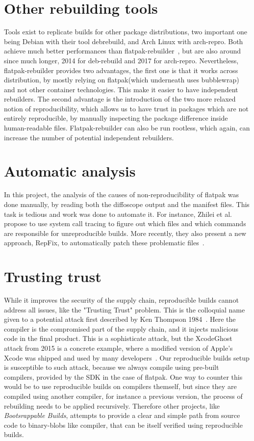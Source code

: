 \documentclass[a4paper,11pt,oneside]{report}
\theoremstyle{definition}
\newcommand{\sysname}{flatpak-rebuilder\xspace}
\newcommand{\Sysname}{Flatpak-rebuilder\xspace}
\newcommand{\rb}{reproducible builds\xspace}
\newcommand{\fp}{flatpak\xspace}
\begin{document}
\section{Other rebuilding tools}
Tools exist to replicate builds for other package distributions, two important
one being Debian with their tool debrebuild, and Arch Linux with arch-repro.
Both achieve much better performances than \sysname~\cite{debian:repro,
arch-rebuilderd}, but are also around since much longer, 2014 for deb-rebuild
and 2017 for arch-repro. Nevertheless, \sysname provides two advantages, the
first one is that it works across distribution, by mostly relying on \fp (which
underneath uses bubblewrap) and not other container technologies. This make it
easier to have independent rebuilders. The second advantage is the introduction
of the two more relaxed notion of reproducibility, which allows us to have
trust in packages which are not entirely reproducible, by manually inspecting
the package difference inside human-readable files. \Sysname can also be run
rootless, which again, can increase the number of potential independent
rebuilders.

\section{Automatic analysis}
In this project, the analysis of the causes of non-reproducibility of \fp was
done manually, by reading both the diffoscope output and the manifest files.
This task is tedious and work was done to automate it. For instance, Zhilei et
al.~\cite{DBLP:journals/corr/abs-1803-06766} propose to use system call tracing
to figure out which files and which commands are responsible for unreproducible
builds. More recently, they also present a new approach, RepFix, to
automatically patch these problematic files~\cite{}.

\section{Trusting trust}
While it improves the security of the supply chain, \rb cannot address all
issues, like the "Trusting Trust" problem. This is the colloquial name given to
a potential attack first described by Ken Thompson 1984~\cite{thompson1984}.
Here the compiler is the compromised part of the supply chain, and it injects
malicious code in the final product. This is a sophisticate attack, but the
XcodeGhost attack from 2015 is a concrete example, where a modified version of
Apple's Xcode was shipped and used by many developers~\cite{enwiki:1054394297}.
Our \rb setup is susceptible to such attack, because we always compile using
pre-built compilers, provided by the SDK in the case of \fp. One way to counter
this would be to use \rb on compilers themself, but since they are compiled
using another compiler, for instance a previous version, the process of
rebuilding needs to be applied recursively. Therefore other projects, like
\emph{Bootsrappable Builds}, attempts to provide a clear and simple path from
source code to binary-blobs like compiler, that can be itself verified using
\rb.
\end{document}
